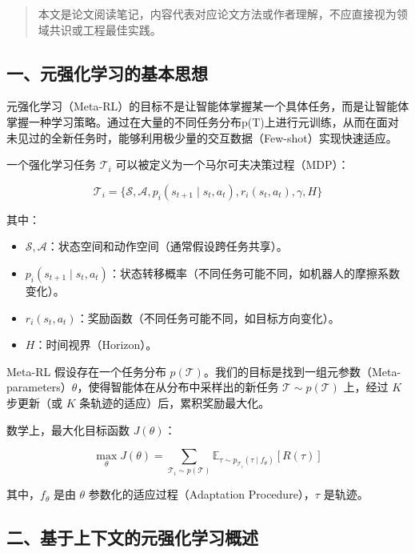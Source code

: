 \begin{quote}
本文是论文阅读笔记，内容代表对应论文方法或作者理解，不应直接视为领域共识或工程最佳实践。
\end{quote}

\hypertarget{ux4e00ux5143ux5f3aux5316ux5b66ux4e60ux7684ux57faux672cux601dux60f3}{%
\subsection{一、元强化学习的基本思想}\label{ux4e00ux5143ux5f3aux5316ux5b66ux4e60ux7684ux57faux672cux601dux60f3}}

元强化学习（Meta-RL）的目标不是让智能体掌握某一个具体任务，而是让智能体掌握一种学习策略。通过在大量的不同任务分布p(T)上进行元训练，从而在面对未见过的全新任务时，能够利用极少量的交互数据（Few-shot）实现快速适应。

一个强化学习任务 \(\mathcal{T}_i\) 可以被定义为一个马尔可夫决策过程（MDP）：

\[
\mathcal{T}_i = \{\mathcal{S}, \mathcal{A}, p_i(s_{t+1}\mid s_t,a_t), r_i(s_t,a_t), \gamma, H\}
\]

其中：

\begin{itemize}
\tightlist
\item
  \(\mathcal{S}, \mathcal{A}\)：状态空间和动作空间（通常假设跨任务共享）。
\item
  \(p_i(s_{t+1}\mid s_t,a_t)\)：状态转移概率（不同任务可能不同，如机器人的摩擦系数变化）。
\item
  \(r_i(s_t,a_t)\)：奖励函数（不同任务可能不同，如目标方向变化）。
\item
  \(H\)：时间视界（Horizon）。
\end{itemize}

Meta-RL 假设存在一个任务分布 \(p(\mathcal{T})\)。我们的目标是找到一组元参数（Meta-parameters）\(\theta\)，使得智能体在从分布中采样出的新任务 \(\mathcal{T}\sim p(\mathcal{T})\) 上，经过 \(K\) 步更新（或 \(K\) 条轨迹的适应）后，累积奖励最大化。

数学上，最大化目标函数 \(J(\theta)\)：

\[
\max_{\theta} J(\theta) =
\sum_{\mathcal{T}_i\sim p(\mathcal{T})}
\mathbb{E}_{\tau\sim p_{\mathcal{T}_i}(\tau\mid f_{\theta})}
[R(\tau)]
\]

其中，\(f_{\theta}\) 是由 \(\theta\) 参数化的适应过程（Adaptation Procedure），\(\tau\) 是轨迹。

\hypertarget{ux4e8cux57faux4e8eux4e0aux4e0bux6587ux7684ux5143ux5f3aux5316ux5b66ux4e60ux6982ux8ff0}{%
\subsection{二、基于上下文的元强化学习概述}\label{ux4e8cux57faux4e8eux4e0aux4e0bux6587ux7684ux5143ux5f3aux5316ux5b66ux4e60ux6982ux8ff0}}

